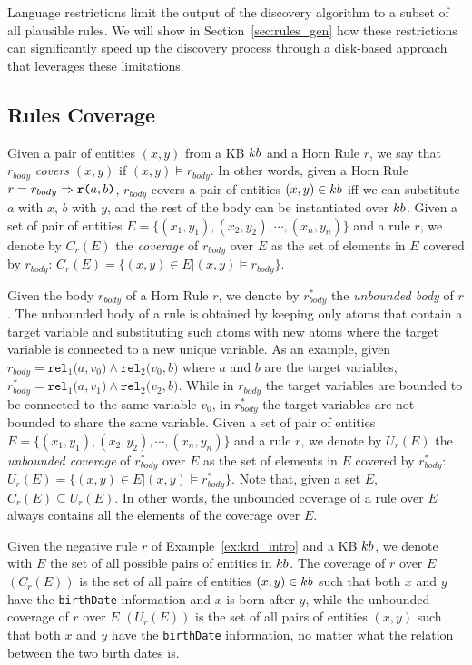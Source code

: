 \vspace{0.5ex} %
Language restrictions limit the output of the discovery algorithm to a subset of all plausible rules. We will show in Section~\ref{sec:rules_gen} how these restrictions can significantly speed up the discovery process through a disk-based approach that leverages these limitations.

\subsection{Rules Coverage}
Given a pair of entities $(x,y)$ from a KB ${\sc kb}$ and a Horn Rule $r$, we say that $r_{body}$ \emph{covers} $(x,y)$ if
$(x,y) \models r_{body}$. In other words, given a Horn Rule $r = r_{body} \Rightarrow \texttt{r(}a,b\texttt{)}$, $r_{body}$ covers a pair of entities $(x,y) \in {\sc kb}$ iff we can substitute $a$ with $x$, $b$ with $y$, and the rest of the body can be instantiated over ${\sc kb}$. Given a set of pair of entities $E = \{(x_1,y_1),(x_2,y_2),\cdots,(x_n,y_n)\}$ and a rule $r$, we denote by $C_r(E)$ the \emph{coverage} of $r_{body}$ over $E$ as the set of elements in $E$ covered by $r_{body}$: $C_r(E)=\{(x,y) \in E | (x,y) \models r_{body}\}$.

Given the body $r_{body}$ of a Horn Rule $r$, we denote by $r^{*}_{body}$ the \emph{unbounded body} of $r$. The unbounded body of a rule is obtained by keeping only atoms that contain a target variable and substituting such atoms with new atoms where the target variable is connected to a new unique variable. As an example, given $r_{body} = \texttt{rel}_1\texttt{(}a,v_0\texttt{)} \wedge \texttt{rel}_2\texttt{(}v_0,b\texttt{)}$ where $a$ and $b$ are the target variables, $r^{*}_{body} = \texttt{rel}_1\texttt{(}a,v_1\texttt{)} \wedge \texttt{rel}_2\texttt{(}v_2,b\texttt{)}$.
While in $r_{body}$ the target variables are bounded to be connected to the same variable $v_0$, in $r^{*}_{body}$ the target variables are not bounded to share the same variable.
Given a set of pair of entities $E = \{(x_1,y_1),(x_2,y_2),\cdots,(x_n,y_n)\}$ and a rule $r$, we denote by $U_r(E)$ the \emph{unbounded coverage} of $r^{*}_{body}$ over $E$ as the set of elements in $E$ covered by $r^{*}_{body}$: $U_r(E)=\{(x,y) \in E | (x,y) \models r^{*}_{body}\}$. Note that, given a set $E$, $C_r(E) \subseteq U_r(E)$. In other words, the unbounded coverage of a rule over $E$ always contains all the elements of the coverage over $E$.

\begin{example}
	Given the negative rule $r$ of Example~\ref{ex:krd_intro} and a KB ${\sc kb}$, we denote with $E$ the set of all possible pairs of entities in ${\sc kb}$. The coverage of $r$ over $E$ $(C_r(E))$ is the set of all pairs of entities $(x,y) \in {\sc kb}$ such that both $x$ and $y$ have the \texttt{birthDate} information and $x$ is born after $y$, while the unbounded coverage of $r$ over $E$ $(U_r(E))$ is the set of all pairs of entities $(x,y)$ such that both $x$ and $y$ have the \texttt{birthDate} information, no matter what the relation between the two birth dates is. 
\end{example} 

